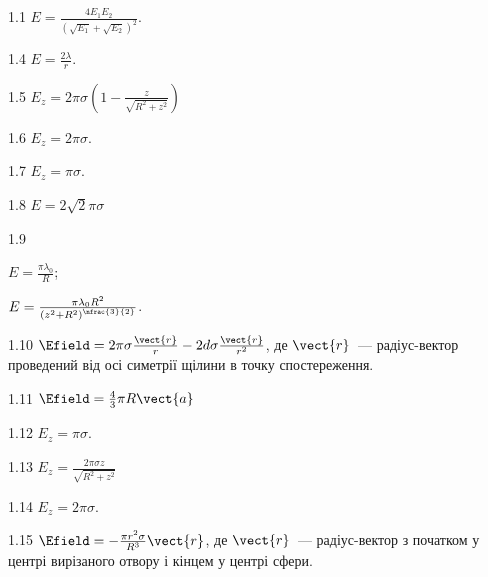 \protect \section *{}
\begin{Solution}{1.{1}}
	$E = \frac{4E_1E_2}{(\sqrt{E_1} + \sqrt{E_2})^2}$.
\end{Solution}
\begin{Solution}{1.{4}}
	$E = \frac{2\lambda}{r}.$
\end{Solution}
\begin{Solution}{1.{5}}
	$E_z = 2\pi\sigma \left( 1 - \frac{z}{\sqrt{R^2 + z^2}}\right)$
\end{Solution}
\begin{Solution}{1.{6}}
	$E_z = 2\pi\sigma$.
\end{Solution}
\begin{Solution}{1.{7}}
	$E_z = \pi\sigma$.
\end{Solution}
\begin{Solution}{1.{8}}
	$E=2\sqrt{2}\pi\sigma$
\end{Solution}
\begin{Solution}{1.{9}}
	\begin{enumerate*}[label=\alph*)]
		\item $E = \frac{\pi\lambda_0}{R}$;
		\item $E = \frac{\pi\lambda_0R^2}{\left( z^2 + R^2\right)^{\nfrac{3}{2}}}$.
	\end{enumerate*}
\end{Solution}
\begin{Solution}{1.{10}}
	$\Efield = 2\pi\sigma\frac{\vect{r}}{r} - 2d\sigma\frac{\vect{r}}{r^2}$, де $\vect{r}$~--- радіус-вектор проведений від осі симетрії щілини в точку спостереження.
\end{Solution}
\begin{Solution}{1.{11}}
	$\Efield = \frac43 \pi R \vect{a}$
\end{Solution}
\begin{Solution}{1.{12}}
	$E_z = \pi\sigma$.
\end{Solution}
\begin{Solution}{1.{13}}
	$E_z = \frac{2\pi\sigma z}{\sqrt{R^2 + z^2}}$
\end{Solution}
\begin{Solution}{1.{14}}
	$E_z = 2\pi\sigma$.
\end{Solution}
\begin{Solution}{1.{15}}
	$\Efield =-\frac{\pi r^2 \sigma}{R^3}\vect{r}$, де $\vect{r}$~--- радіус-вектор з початком у центрі вирізаного отвору і кінцем у центрі сфери.
\end{Solution}
